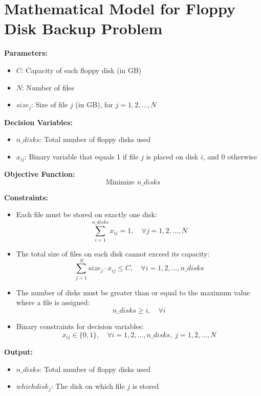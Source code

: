 \documentclass{article}
\begin{document}
\section*{Mathematical Model for Floppy Disk Backup Problem}

\textbf{Parameters:}
\begin{itemize}
    \item $C$: Capacity of each floppy disk (in GB)
    \item $N$: Number of files
    \item $size_j$: Size of file $j$ (in GB), for $j = 1, 2, \ldots, N$
\end{itemize}

\textbf{Decision Variables:}
\begin{itemize}
    \item $n\_disks$: Total number of floppy disks used
    \item $x_{ij}$: Binary variable that equals 1 if file $j$ is placed on disk $i$, and 0 otherwise
\end{itemize}

\textbf{Objective Function:}
\[
\text{Minimize } n\_disks
\]

\textbf{Constraints:}
\begin{itemize}
    \item Each file must be stored on exactly one disk:
    \[
    \sum_{i=1}^{n\_disks} x_{ij} = 1, \quad \forall j = 1, 2, \ldots, N
    \]
    
    \item The total size of files on each disk cannot exceed its capacity:
    \[
    \sum_{j=1}^{N} size_j \cdot x_{ij} \leq C, \quad \forall i = 1, 2, \ldots, n\_disks
    \]
    
    \item The number of disks must be greater than or equal to the maximum value where a file is assigned:
    \[
    n\_disks \geq i, \quad \forall i
    \]
    
    \item Binary constraints for decision variables:
    \[
    x_{ij} \in \{0, 1\}, \quad \forall i = 1, 2, \ldots, n\_disks, \; j = 1, 2, \ldots, N
    \]
\end{itemize}

\textbf{Output:}
\begin{itemize}
    \item $n\_disks$: Total number of floppy disks used
    \item $whichdisk_j$: The disk on which file $j$ is stored
\end{itemize}
\end{document}
